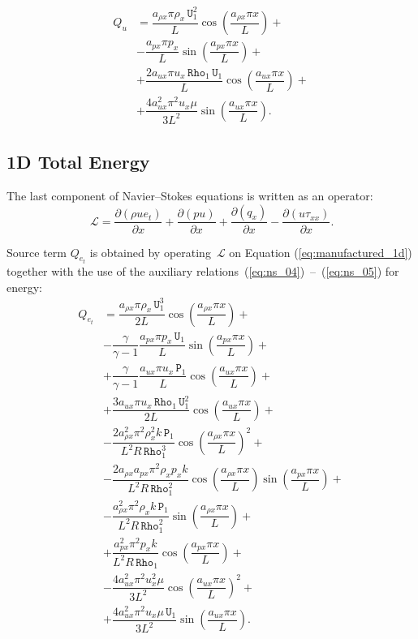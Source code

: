 \documentclass[10pt]{article}
\newcommand{\Diff}[2] {\dfrac{\partial( #1)}{\partial #2}}
\newcommand{\Rho}{\,\mathtt{Rho}}
\newcommand{\PP}{\,\mathtt{P}}
\newcommand{\U}{\,\mathtt{U}}
\newcommand{\Lo}{\,\mathcal{L}}
\begin{document}
\begin{equation}
 \begin{split}
Q_u&=\dfrac{a_{\rho x} \pi \rho_x \U_1^2}{L}\cos\left(\dfrac{a_{\rho x} \pi x}{L}\right) +\\
&-\dfrac{ a_{px} \pi p_x}{L}\sin\left(\dfrac{a_{px} \pi x}{L}\right) +\\
&+  \dfrac{2a_{ux} \pi u_x \Rho_1 \U_1}{L}\cos\left(\dfrac{a_{ux} \pi x}{L}\right)+\\
&+\dfrac{4a_{ux}^2 \pi^2 u_x \mu }{3L^2}\sin\left(\dfrac{a_{ux} \pi x}{L}\right).
 \end{split}
\end{equation}



\subsection{1D Total Energy}


The last component of Navier--Stokes equations is written as an operator:
\begin{equation*}
 \Lo=\Diff{\rho ue_t}{x}+ \Diff{pu}{x}+ \Diff{q_x}{x}-\Diff{u\tau_{xx}}{x} .
\end{equation*}


Source term $Q_{e_t}$ is obtained by operating $\Lo$ on Equation  (\ref{eq:manufactured_1d}) together with the use of the  auxiliary relations~(\ref{eq:ns_04})~--~(\ref{eq:ns_05}) for energy:
  \begin{equation}\label{eq:source_e}
 \begin{split}
Q_{e_t} &= \dfrac{a_{\rho x} \pi \rho_x \U_1^3 }{2L}\cos\left(\dfrac{a_{\rho x} \pi x}{L}\right)+\\
&- \dfrac{\gamma}{\gamma-1}\dfrac{a_{px} \pi p_x \U_1}{L}\sin\left(\dfrac{a_{px} \pi x}{L}\right) +\\
&+ \dfrac{\gamma}{\gamma-1}\dfrac{a_{ux} \pi u_x \PP_1}{L}\cos\left(\dfrac{a_{ux} \pi x}{L}\right)  +\\
&+ \dfrac{ 3 a_{ux} \pi u_x \Rho_1 \U_1^2 }{2L}\cos\left(\dfrac{a_{ux} \pi x}{L}\right)+\\
&-\dfrac{2 a_{\rho x}^2 \pi^2 \rho_x^2 k \PP_1}{L^2 R \Rho_1^3}\cos\left(\dfrac{a_{\rho x} \pi x}{L}\right)^2 +\\
&-\dfrac{2 a_{\rho x} a_{px} \pi^2 \rho_x p_x k }{L^2 R \Rho_1^2}\cos\left(\dfrac{a_{\rho x} \pi x}{L}\right) \sin\left(\dfrac{a_{px} \pi x}{L}\right) +\\
&-\dfrac{a_{\rho x}^2 \pi^2 \rho_x k \PP_1 }{L^2 R \Rho_1^2}\sin\left(\dfrac{a_{\rho x} \pi x}{L}\right) +\\
&+\dfrac{a_{px}^2 \pi^2 p_x k }{L^2 R \Rho_1}\cos\left(\dfrac{a_{px} \pi x}{L}\right) +\\
&-\dfrac{4a_{ux}^2 \pi^2 u_x^2 \mu }{3L^2}\cos\left(\dfrac{a_{ux} \pi x}{L}\right)^2 +\\
&+\dfrac{4a_{ux}^2 \pi^2 u_x \mu \U_1 }{3L^2}\sin\left(\dfrac{a_{ux} \pi x}{L}\right).
 \end{split}
\end{equation}
\end{document}
